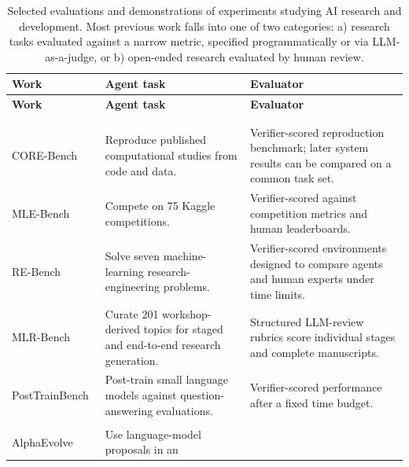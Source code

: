 \documentclass[]{crux} %
\newcommand{\agentrd}{AI R\&D}
\begin{document}

{\small
\begin{longtable}{@{}P{0.21\textwidth}P{0.30\textwidth}P{0.39\textwidth}@{}}
\caption{Selected evaluations and demonstrations of experiments studying AI research and development. Most previous work falls into one of two categories: a) research tasks evaluated against a narrow metric, specified programmatically or via LLM-as-a-judge, or b) open-ended research evaluated by human review.}
\label{tab:prior-work}\\
\toprule
\textbf{Work} & \textbf{Agent task} & \textbf{Evaluator} \\
\midrule
\endfirsthead
\toprule
\textbf{Work} & \textbf{Agent task} & \textbf{Evaluator} \\
\midrule
\endhead
\bottomrule
\endfoot
{} \\
\addlinespace[3pt]
 \\
\addlinespace[2pt]
CORE-Bench~\citep{corebench} & Reproduce published computational studies from
code and data. & Verifier-scored reproduction benchmark; later system results
can be compared on a common task set. \\
MLE-Bench~\citep{mlebench} & Compete on 75 Kaggle competitions. &
Verifier-scored against competition metrics and human leaderboards. \\
RE-Bench~\citep{rebench} & Solve seven machine-learning research-engineering
problems. & Verifier-scored environments designed to compare agents and human
experts under time limits. \\
MLR-Bench~\citep{mlrbench} & Curate 201 workshop-derived topics for staged and
end-to-end research generation. & Structured LLM-review rubrics score
individual stages and complete manuscripts. \\
PostTrainBench~\citep{posttrainbench} & Post-train small language models against
question-answering evaluations. & Verifier-scored performance after a fixed
time budget. \\
\addlinespace[4pt]
 \\
\addlinespace[2pt]
AlphaEvolve~\citep{alphaevolve} & Use language-model proposals in an

\end{longtable}}
\end{document}
